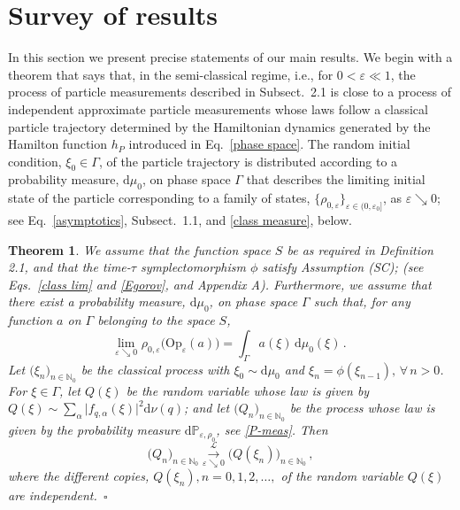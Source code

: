 \documentclass[12pt]{article}
\newtheorem{theorem}{Theorem}[section]
\begin{document}
\section{Survey of results}\label{survey}
In this section we present precise statements of our main results. We begin with a theorem 
that says that, in the semi-classical regime, i.e., for $0<\varepsilon \ll 1$, the process of particle measurements 
described in Subsect.~2.1 is close to a process of independent approximate particle measurements whose laws 
follow a classical particle trajectory determined by the Hamiltonian dynamics generated by 
the Hamilton function $h_P$ introduced in Eq.~\eqref{phase space}. 
The random initial condition, $\xi_0 \in \Gamma$, of the particle trajectory is distributed according 
to a probability measure, $\text{d}\mu_0$, on phase space $\Gamma$ that describes the limiting initial 
state of the particle corresponding to a family of states, $\big\{\rho_{0,\varepsilon}\big\}_{\varepsilon\in (0, \varepsilon_0]}$, as $\varepsilon \searrow 0$; see Eq.~\eqref{asymptotics}, 
Subsect.~1.1, and \eqref{class measure}, below.
\begin{theorem} We assume that the function space $S$ be as required in Definition 2.1, and that the
time-$\tau$ symplectomorphism $\phi$ satisfy Assumption (SC); (see Eqs.~\eqref{class lim} and \eqref{Egorov}, 
and Appendix A). Furthermore, we assume that there exist a probability measure, $\text{d}\mu_0$, on phase space $\Gamma$ such that, for any function $a$ on $\Gamma$ belonging to the space 
$S$,
\begin{equation}\label{class measure}
\underset{\varepsilon \searrow 0}{\text{lim}}\,\, \rho_{0, \varepsilon} \big(\text{Op}_{\varepsilon}(a)\big) =
 \int_{\Gamma} a(\xi)\,\text{d}\mu_{0}(\xi)\,.
\end{equation}
Let $\big(\xi_n\big)_{n\in \mathbb{N}_0}$ be the classical process with $\xi_0 \sim \text{d}\mu_0$ and 
$\xi_n= \phi(\xi_{n-1}), \,\forall \,n>0$. For $\xi \in \Gamma$, let $Q(\xi)$ be the random variable whose law is 
given by
$Q(\xi) \sim \sum_{\alpha}\big| f_{q, \alpha}(\xi)\big|^{2} \text{d}\nu(q)$; and let $\big(Q_n\big)_{n\in \mathbb{N}_0}$ 
be the process whose law is given by the probability measure
$\mathrm{d}\mathbb{P}_{\varepsilon, \rho_0}$, see \eqref{P-meas}. Then
$$ \big(Q_n\big)_{n\in \mathbb{N}_0} \overset{\mathcal{L}}{\underset{\varepsilon \searrow 0}{\longrightarrow}} 
\big(Q(\xi_n)\big)_{n \in \mathbb{N}_0}\,,$$
where the different copies, $Q(\xi_{n}), n=0,1,2, \dots,$ of the random variable $Q(\xi)$ are independent.\, $\square$
\end{theorem}
\end{document}
